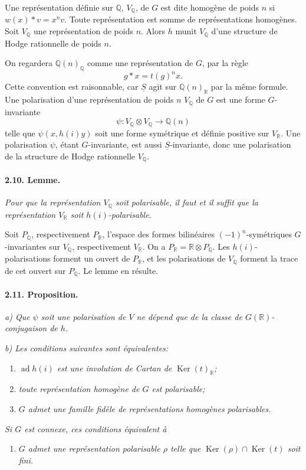 \documentclass[10pt]{article}
\newcommand{\Q}{\mathbb{Q}}
\newcommand{\R}{\mathbb{R}}
\newcommand{\Ker}{\operatorname{Ker}}
\newcommand{\ad}{\operatorname{ad}}
\begin{document}
Une représentation définie sur $\Q$, $V_\Q$, de $G$ est dite homogène de poids $n$ si $w(x)*v=x^n v$. Toute représentation est somme de représentations homogènes. Soit $V_\Q$ une représentation de poids $n$. Alors $h$ munit $V_\Q$ d'une structure de Hodge rationnelle de poids $n$.

On regardera $\Q(n)_\Q$ comme une représentation de $G$, par la règle
\[
g*x=t(g)^n x.
\]
Cette convention est raisonnable, car $\underline S$ agit sur $\Q(n)_\R$ par la même formule. Une polarisation d'une représentation de poids $n$ $V_\Q$ de $G$ est une forme $G$-invariante
\[
\psi:V_\Q\otimes V_\Q\longrightarrow\Q(n)
\]
telle que $\psi(x,h(i)y)$ soit une forme symétrique et définie positive sur $V_\R$. Une polarisation $\psi$, étant $G$-invariante, est aussi $\underline S$-invariante, donc une polarisation de la structure de Hodge rationnelle $V_\Q$.

\paragraph{2.10. Lemme.} \emph{Pour que la représentation $V_\Q$ soit polarisable, il faut et il suffit que la représentation $V_\R$ soit $h(i)$-polarisable.}

Soit $P_\Q$, respectivement $P_\R$, l'espace des formes bilinéaires $(-1)^n$-symétriques $G$-invariantes sur $V_\Q$, respectivement $V_\R$. On a $P_\R=\R\otimes P_\Q$. Les $h(i)$-polarisations forment un ouvert de $P_\R$, et les polarisations de $V_\Q$ forment la trace de cet ouvert sur $P_\Q$. Le lemme en résulte.

\paragraph{2.11. Proposition.} \emph{a) Que $\psi$ soit une polarisation de $V$ ne dépend que de la classe de $G(\R)$-conjugaison de $h$.}

\emph{b) Les conditions suivantes sont équivalentes:}
\begin{enumerate}[label=(\roman*)]
\item \emph{$\ad h(i)$ est une involution de Cartan de $\Ker(t)_\R$;}
\item \emph{toute représentation homogène de $G$ est polarisable;}
\item \emph{$G$ admet une famille fidèle de représentations homogènes polarisables.}
\end{enumerate}
\emph{Si $G$ est connexe, ces conditions équivalent à}
\begin{enumerate}[label=(iii\textquotesingle)]
\item \emph{$G$ admet une représentation polarisable $\rho$ telle que $\Ker(\rho)\cap\Ker(t)$ soit fini.}
\end{enumerate}
\end{document}
